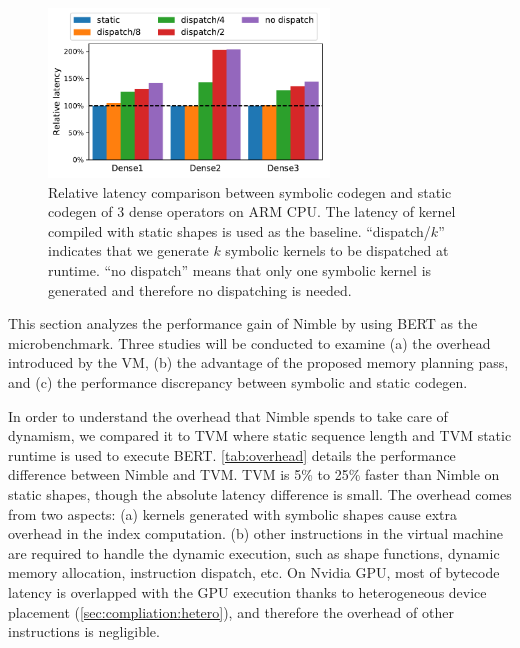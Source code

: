 \begin{figure}[t]
    \centering
    \includegraphics[height=4.5cm]{figs/sym_codegen.pdf}
    \caption{Relative latency comparison between symbolic codegen and static codegen of 3 dense operators on ARM CPU. The latency of kernel compiled with static shapes is used as the baseline. ``dispatch/$k$'' indicates that we generate $k$ symbolic kernels to be dispatched at runtime. ``no dispatch'' means that only one symbolic kernel is generated and therefore no dispatching is needed. %
    }
    \label{fig:sym-codegen}
\end{figure}

This section analyzes the performance gain of Nimble by using BERT as the microbenchmark. Three studies will be conducted to examine (a) the overhead introduced by the VM, %
(b) the advantage of the proposed memory planning pass, and (c) the performance discrepancy between symbolic and static codegen.

 In order to understand the overhead that Nimble spends to take care of dynamism, we compared it to TVM where static sequence length and TVM static runtime is used to execute BERT.
\autoref{tab:overhead} details the performance difference between Nimble and TVM.  TVM is 5\% to 25\% faster than Nimble on static shapes, though the absolute latency difference is small. The overhead comes from two aspects: (a) kernels generated with symbolic shapes cause extra overhead in the index computation. (b) other instructions in the virtual machine are required to handle the dynamic execution, such as shape functions, dynamic memory allocation, instruction dispatch, etc.
On Nvidia GPU, most of bytecode latency is overlapped with the GPU execution thanks to heterogeneous device placement (\autoref{sec:compliation:hetero}), and therefore the overhead of other instructions is negligible.

